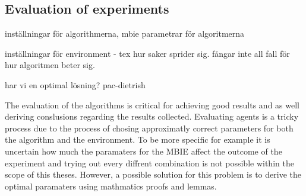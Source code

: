 \subsection{Evaluation of experiments }
inställningar för algorithmerna, mbie parametrar för algoritmerna

inställningar för environment - tex hur saker sprider sig. fångar inte all fall för hur algoritmen beter sig.

har vi en optimal lösning? pac-dietrish

The evaluation of the algorithms is critical for achieving good results and as well deriving conslusions regarding the results collected. Evaluating agents is a tricky process due to the process of chosing approximatly correct parameters for both the algorithm and the environment. To be more specific for example it is uncertain how much the paramaters for the MBIE affect the outcome of the experiment and trying out every diffrent combination is not possible within the scope of this theses. However, a possible solution for this problem is to derive the optimal paramaters using mathmatics proofs and lemmas.

